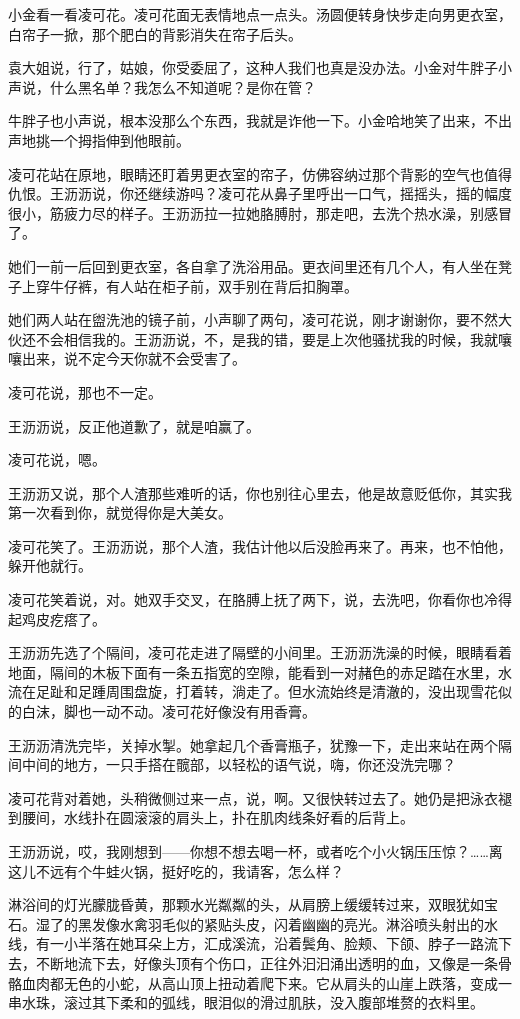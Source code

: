 \documentclass[lang=cn,newtx,12pt,scheme=chinese]{elegantbook}
\begin{document}
小金看一看凌可花。凌可花面无表情地点一点头。汤圆便转身快步走向男更衣室，白帘子一掀，那个肥白的背影消失在帘子后头。

袁大姐说，行了，姑娘，你受委屈了，这种人我们也真是没办法。小金对牛胖子小声说，什么黑名单？我怎么不知道呢？是你在管？

牛胖子也小声说，根本没那么个东西，我就是诈他一下。小金哈地笑了出来，不出声地挑一个拇指伸到他眼前。

凌可花站在原地，眼睛还盯着男更衣室的帘子，仿佛容纳过那个背影的空气也值得仇恨。王沥沥说，你还继续游吗？凌可花从鼻子里呼出一口气，摇摇头，摇的幅度很小，筋疲力尽的样子。王沥沥拉一拉她胳膊肘，那走吧，去洗个热水澡，别感冒了。

她们一前一后回到更衣室，各自拿了洗浴用品。更衣间里还有几个人，有人坐在凳子上穿牛仔裤，有人站在柜子前，双手别在背后扣胸罩。

她们两人站在盥洗池的镜子前，小声聊了两句，凌可花说，刚才谢谢你，要不然大伙还不会相信我的。王沥沥说，不，是我的错，要是上次他骚扰我的时候，我就嚷嚷出来，说不定今天你就不会受害了。

凌可花说，那也不一定。

王沥沥说，反正他道歉了，就是咱赢了。

凌可花说，嗯。

王沥沥又说，那个人渣那些难听的话，你也别往心里去，他是故意贬低你，其实我第一次看到你，就觉得你是大美女。

凌可花笑了。王沥沥说，那个人渣，我估计他以后没脸再来了。再来，也不怕他，躲开他就行。

凌可花笑着说，对。她双手交叉，在胳膊上抚了两下，说，去洗吧，你看你也冷得起鸡皮疙瘩了。

王沥沥先选了个隔间，凌可花走进了隔壁的小间里。王沥沥洗澡的时候，眼睛看着地面，隔间的木板下面有一条五指宽的空隙，能看到一对赭色的赤足踏在水里，水流在足趾和足踵周围盘旋，打着转，淌走了。但水流始终是清澈的，没出现雪花似的白沫，脚也一动不动。凌可花好像没有用香膏。

王沥沥清洗完毕，关掉水掣。她拿起几个香膏瓶子，犹豫一下，走出来站在两个隔间中间的地方，一只手搭在髋部，以轻松的语气说，嗨，你还没洗完哪？

凌可花背对着她，头稍微侧过来一点，说，啊。又很快转过去了。她仍是把泳衣褪到腰间，水线扑在圆滚滚的肩头上，扑在肌肉线条好看的后背上。

王沥沥说，哎，我刚想到——你想不想去喝一杯，或者吃个小火锅压压惊？……离这儿不远有个牛蛙火锅，挺好吃的，我请客，怎么样？

淋浴间的灯光朦胧昏黄，那颗水光粼粼的头，从肩膀上缓缓转过来，双眼犹如宝石。湿了的黑发像水禽羽毛似的紧贴头皮，闪着幽幽的亮光。淋浴喷头射出的水线，有一小半落在她耳朵上方，汇成溪流，沿着鬓角、脸颊、下颌、脖子一路流下去，不断地流下去，好像头顶有个伤口，正往外汩汩涌出透明的血，又像是一条骨骼血肉都无色的小蛇，从高山顶上扭动着爬下来。它从肩头的山崖上跌落，变成一串水珠，滚过其下柔和的弧线，眼泪似的滑过肌肤，没入腹部堆赘的衣料里。
\end{document}
